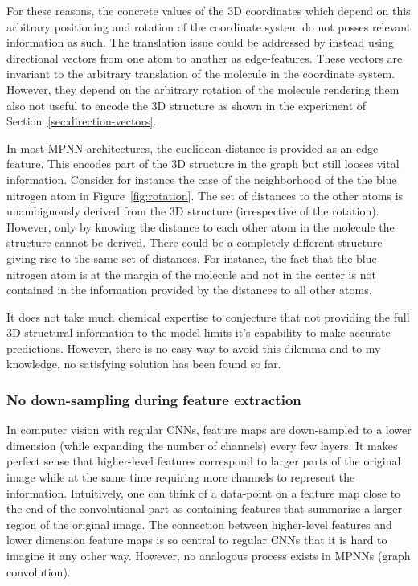 For these reasons, the concrete values of the 3D coordinates which depend on this arbitrary positioning and rotation of the coordinate system do not posses relevant information as such. The translation issue could be addressed by instead using directional vectors from one atom to another as edge-features. These vectors are invariant to the arbitrary translation of the molecule in the coordinate system. However, they depend on the arbitrary rotation of the molecule rendering them also not useful to encode the 3D structure as shown in the experiment of Section~\ref{sec:direction-vectors}.

In most MPNN architectures, the euclidean distance is provided as an edge feature. This encodes part of the 3D structure in the graph but still looses vital information. Consider for instance the case of the neighborhood of the the blue nitrogen atom in Figure~\ref{fig:rotation}. The set of distances to the other atoms is unambiguously derived from the 3D structure (irrespective of the rotation). However, only by knowing the distance to each other atom in the molecule the structure cannot be derived. There could be a completely different structure giving rise to the same set of distances. For instance, the fact that the blue nitrogen atom is at the margin of the molecule and not in the center is not contained in the information provided by the distances to all other atoms.


It does not take much chemical expertise to conjecture that not providing the full 3D structural information to the model limits it's capability to make accurate predictions. However, there is no easy way to avoid this dilemma and to my knowledge, no satisfying solution has been found so far.

\subsubsection{No down-sampling during feature extraction}

In computer vision with regular CNNs, feature maps are down-sampled to a lower dimension (while expanding the number of channels) every few layers. It makes perfect sense that higher-level features correspond to larger parts of the original image while at the same time requiring more channels to represent the information. Intuitively, one can think of a data-point on a feature map close to the end of the convolutional part as containing features that summarize a larger region of the original image. The connection between higher-level features and lower dimension feature maps is so central to regular CNNs that it is hard to imagine it any other way. However, no analogous process exists in MPNNs (graph convolution).

